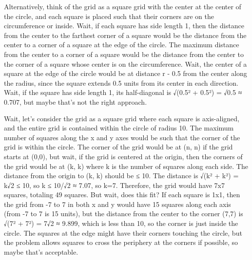 Alternatively, think of the grid as a square grid with the center at the center of the circle, and each square is placed such that their corners are on the circumference or inside. Wait, if each square has side length 1, then the distance from the center to the farthest corner of a square would be the distance from the center to a corner of a square at the edge of the circle. The maximum distance from the center to a corner of a square would be the distance from the center to the corner of a square whose center is on the circumference. Wait, the center of a square at the edge of the circle would be at distance r - 0.5 from the center along the radius, since the square extends 0.5 units from its center in each direction. Wait, if the square has side length 1, its half-diagonal is √(0.5² + 0.5²) = √0.5 ≈ 0.707, but maybe that's not the right approach.

Wait, let's consider the grid as a square grid where each square is axis-aligned, and the entire grid is contained within the circle of radius 10. The maximum number of squares along the x and y axes would be such that the corner of the grid is within the circle. The corner of the grid would be at (n, n) if the grid starts at (0,0), but wait, if the grid is centered at the origin, then the corners of the grid would be at (k, k) where k is the number of squares along each side. The distance from the origin to (k, k) should be ≤ 10. The distance is √(k² + k²) = k√2 ≤ 10, so k ≤ 10/√2 ≈ 7.07, so k=7. Therefore, the grid would have 7x7 squares, totaling 49 squares. But wait, does this fit? If each square is 1x1, then the grid from -7 to 7 in both x and y would have 15 squares along each axis (from -7 to 7 is 15 units), but the distance from the center to the corner (7,7) is √(7² + 7²) = 7√2 ≈ 9.899, which is less than 10, so the corner is just inside the circle. The squares at the edge might have their corners touching the circle, but the problem allows squares to cross the periphery at the corners if possible, so maybe that's acceptable.

